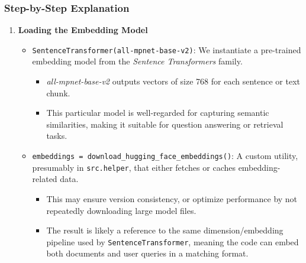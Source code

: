 \subsubsection*{Step-by-Step Explanation}
\begin{enumerate}
    \item \textbf{Loading the Embedding Model}
    \begin{itemize}
        \item \texttt{SentenceTransformer(\textquotesingle all-mpnet-base-v2\textquotesingle)}: 
        We instantiate a pre-trained embedding model from the \emph{Sentence Transformers} family.  
        \begin{itemize}
            \item \emph{all-mpnet-base-v2} outputs vectors of size 768 for each sentence or text chunk.
            \item This particular model is well-regarded for capturing semantic similarities, making it suitable for question answering or retrieval tasks.
        \end{itemize}

        \item \texttt{embeddings = download\_hugging\_face\_embeddings()}: 
        A custom utility, presumably in \texttt{src.helper}, that either fetches or caches embedding-related data.  
        \begin{itemize}
            \item This may ensure version consistency, or optimize performance by not repeatedly downloading large model files.
            \item The result is likely a reference to the same dimension/embedding pipeline used by \texttt{SentenceTransformer}, meaning the code can embed both documents and user queries in a matching format.
        \end{itemize}
    \end{itemize}


\end{enumerate}
